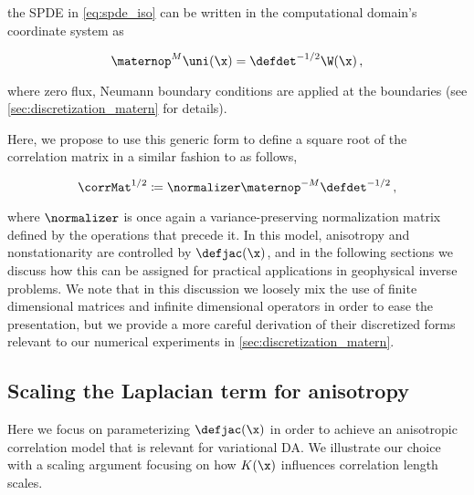\documentclass[alpha-refs]{wiley-article}
\begin{document}
the SPDE in \cref{eq:spde_iso} can be written in the computational domain's coordinate system as
\begin{linenomath*}\begin{equation}
    \maternop^M \uni(\x) =
    \defdet^{-1/2}\W(\x) \, ,
    \label{eq:spde_general}
\end{equation}\end{linenomath*}
where zero flux, Neumann boundary conditions are applied at the boundaries
(see \cref{sec:discretization_matern} for details).

Here, we propose to use this generic form to define a square root of the
correlation matrix in a similar fashion to
\citet{weaver_correlation_2001, mirouze_representation_2010,
carrier_background-error_2010}
as follows,
\begin{linenomath*}\begin{equation}
    \corrMat^{1/2} \coloneqq \normalizer
    \maternop^{-M}
    \defdet^{-1/2} \, ,
    \label{eq:matern_operator}
\end{equation}\end{linenomath*}
where $\normalizer$ is
once again a variance-preserving normalization matrix defined by the operations
that precede it.
In this model,
anisotropy and nonstationarity are controlled by
$\defjac(\x)$, and in the following sections
we discuss how this can be assigned for
practical applications in geophysical inverse problems.
We note that in this discussion we loosely mix the use of
finite dimensional matrices and infinite dimensional operators
in order to ease the presentation, but we provide a more careful
derivation of their discretized forms relevant to our numerical experiments in
\cref{sec:discretization_matern}.

\subsection{Scaling the Laplacian term for anisotropy}
\label{ssec:scaling_laplacian}

Here we focus on parameterizing $\defjac(\x)$ in order to achieve an anisotropic
correlation model that is relevant for variational DA.
We illustrate our choice with a scaling argument focusing on how $K(\x)$
influences correlation length scales.
\end{document}
